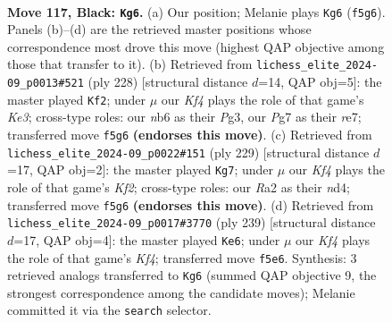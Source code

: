 \documentclass[11pt]{article}
\begin{document}
\begin{figure}[p]\centering
\begin{subfigure}{0.46\textwidth}\centering
\resizebox{\linewidth}{!}{%
\newchessgame
\chessboard[
  setfen={6R1/6p1/1N3p2/5k1p/7P/6PK/r7/8 b - - 59 117},
  showmover=false,
  pgfstyle=straightmove, color=movearrow, markmove={f5-g6}
]}
\caption{}
\end{subfigure}\hfill
\begin{subfigure}{0.46\textwidth}\centering
\resizebox{\linewidth}{!}{%
\newchessgame
\chessboard[
  setfen={8/4r3/6pk/7p/R6P/4KPP1/8/8 w - - 39 115},
  showmover=false,
  pgfstyle=straightmove, color=movearrow, markmove={e3-f2}
]}
\caption{}
\end{subfigure}
\\[4pt]
\begin{subfigure}{0.46\textwidth}\centering
\resizebox{\linewidth}{!}{%
\newchessgame
\chessboard[
  setfen={8/5k2/6p1/4P2p/3N1K1P/2n3P1/8/8 b - - 38 115},
  showmover=false,
  pgfstyle=straightmove, color=movearrow, markmove={f7-g7}
]}
\caption{}
\end{subfigure}\hfill
\begin{subfigure}{0.46\textwidth}\centering
\resizebox{\linewidth}{!}{%
\newchessgame
\chessboard[
  setfen={8/8/6p1/5k1p/7P/5RPK/3r4/8 b - - 77 120},
  showmover=false,
  pgfstyle=straightmove, color=movearrow, markmove={f5-e6}
]}
\caption{}
\end{subfigure}
\caption{\textbf{Move 117, Black: \texttt{Kg6}.} (a) Our position; Melanie plays \texttt{Kg6} (\texttt{f5g6}). Panels (b)--(d) are the retrieved master positions whose correspondence most drove this move (highest QAP objective among those that transfer to it). (b) Retrieved from \texttt{lichess\_elite\_2024-09\_p0013\#521} (ply 228) [structural distance $d$=14, QAP obj=5]: the master played \texttt{Kf2}; under $\mu$ our \emph{Kf4} plays the role of that game's \emph{Ke3}; cross-type roles: our \emph{n}b6 as their \emph{P}g3, our \emph{P}g7 as their \emph{r}e7; transferred move \texttt{f5g6} \textbf{(endorses this move)}. (c) Retrieved from \texttt{lichess\_elite\_2024-09\_p0022\#151} (ply 229) [structural distance $d$=17, QAP obj=2]: the master played \texttt{Kg7}; under $\mu$ our \emph{Kf4} plays the role of that game's \emph{Kf2}; cross-type roles: our \emph{R}a2 as their \emph{n}d4; transferred move \texttt{f5g6} \textbf{(endorses this move)}. (d) Retrieved from \texttt{lichess\_elite\_2024-09\_p0017\#3770} (ply 239) [structural distance $d$=17, QAP obj=4]: the master played \texttt{Ke6}; under $\mu$ our \emph{Kf4} plays the role of that game's \emph{Kf4}; transferred move \texttt{f5e6}. Synthesis: 3 retrieved analogs transferred to \texttt{Kg6} (summed QAP objective 9, the strongest correspondence among the candidate moves); Melanie committed it via the \texttt{search} selector.}
\label{fig:thought-m233}
\end{figure}
\end{document}
